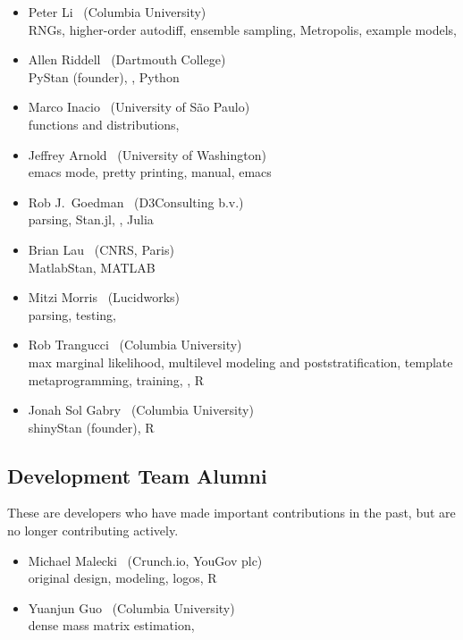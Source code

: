 \begin{itemize}
\\ {\footnotesize RStan (founder), \Cpp, Rcpp, R}
\item Peter Li \   (Columbia University)
\\ {\footnotesize RNGs, higher-order autodiff, ensemble sampling,
  Metropolis, example models, \Cpp}
\item Allen Riddell \   (Dartmouth College)
\\ {\footnotesize PyStan (founder), \Cpp, Python}
\item Marco Inacio \   (University of S\~{a}o Paulo)
\\ {\footnotesize functions and distributions, \Cpp}
\item Jeffrey Arnold \   (University of Washington)
\\ {\footnotesize emacs mode, pretty printing, manual, emacs}
\item Rob J.\ Goedman \ (D3Consulting b.v.)
\\ {\footnotesize parsing, Stan.jl, \Cpp, Julia}
\item Brian Lau \ (CNRS, Paris)
\\ {\footnotesize MatlabStan, MATLAB}
\item Mitzi Morris \   (Lucidworks)
\\ {\footnotesize parsing, testing, \Cpp}
\item Rob Trangucci \   (Columbia University)
\\ {\footnotesize max marginal likelihood, multilevel modeling and
  poststratification, template metaprogramming, training, \Cpp, R}
\item Jonah Sol Gabry \ (Columbia University)
\\ {\footnotesize shinyStan (founder), R}
\end{itemize}

\subsection*{Development Team Alumni}

These are developers who have made important contributions in the
past, but are no longer contributing actively.

\begin{itemize}
\item Michael Malecki \ (Crunch.io, YouGov plc)
\\ {\footnotesize original design, modeling, logos, R}
\item Yuanjun Guo \ (Columbia University)
\\ {\footnotesize dense mass matrix estimation, \Cpp}
\end{itemize}

